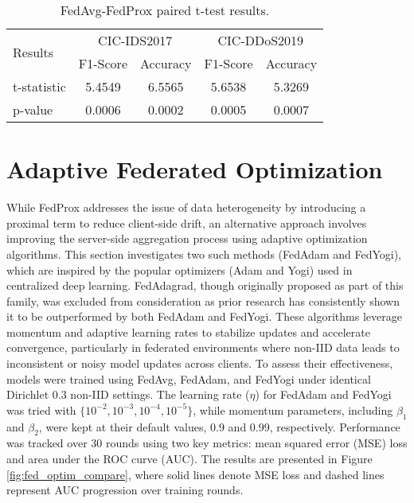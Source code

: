 \begin{table}[h]
    \caption{FedAvg-FedProx paired t-test results.}
    \centering
    \begin{tabular}{l|c|c|c|c}
        \multirow{2}{*}{Results} & \multicolumn{2}{|c|}{CIC-IDS2017} & \multicolumn{2}{|c}{CIC-DDoS2019} \\
        \cline{2-5} & F1-Score & Accuracy & F1-Score & Accuracy \\
        \hline\hline
        t-statistic & 5.4549 & 6.5565 & 5.6538 & 5.3269 \\
        p-value & 0.0006 & 0.0002 & 0.0005 & 0.0007 \\
    \end{tabular}
    \label{tbl:fedavg_fedprox_compare}
\end{table}

\section{Adaptive Federated Optimization}

While FedProx addresses the issue of data heterogeneity by introducing a proximal term to reduce client-side drift, an alternative approach involves improving the server-side aggregation process using adaptive optimization algorithms. This section investigates two such methods (FedAdam and FedYogi), which are inspired by the popular optimizers (Adam and Yogi) used in centralized deep learning. FedAdagrad, though originally proposed as part of this family, was excluded from consideration as prior research has consistently shown it to be outperformed by both FedAdam and FedYogi. These algorithms leverage momentum and adaptive learning rates to stabilize updates and accelerate convergence, particularly in federated environments where non-IID data leads to inconsistent or noisy model updates across clients. To assess their effectiveness, models were trained using FedAvg, FedAdam, and FedYogi under identical Dirichlet 0.3 non-IID settings. The learning rate ($\eta$) for FedAdam and FedYogi was tried with $\{10^{-2}, 10^{-3}, 10^{-4}, 10^{-5}\}$, while momentum parameters, including $\beta_1$ and $\beta_2$, were kept at their default values, 0.9 and 0.99, respectively. Performance was tracked over 30 rounds using two key metrics: mean squared error (MSE) loss and area under the ROC curve (AUC). The results are presented in Figure \ref{fig:fed_optim_compare}, where solid lines denote MSE loss and dashed lines represent AUC progression over training rounds.

